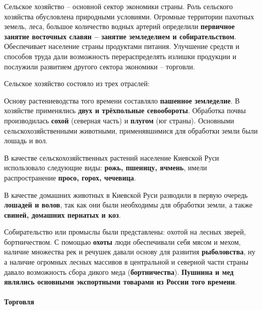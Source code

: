 \documentclass{article}
\begin{document}
Сельское хозяйство – основной сектор экономики страны. Роль сельского хозяйства обусловлена природными условиями. Огромные территории пахотных земель, леса, большое количество водных артерий определили \textbf{первичное занятие восточных славян – занятие земледелием и собирательством}. Обеспечивает население страны продуктами питания. Улучшение средств и способов труда дали возможность перераспределять излишки продукции и послужили развитием другого сектора экономики – торговли.


Сельское хозяйство состояло из трех отраслей: 

\begin{multienumerate}
\end{multienumerate}

\hfill

Основу растениеводства того времени составляло \textbf{пашенное земледелие}. В хозяйстве применялись \textbf{двух и трёхпольные севообороты}. Обработка почвы производилась \textbf{сохой} (северная часть) и \textbf{плугом} (юг страны). Основными сельскохозяйственными животными, применявшимися для обработки земли были лошадь и вол.

\hfill

В качестве сельскохозяйственных растений население Киевской Руси использовало следующие виды: \textbf{рожь, пшеницу, ячмень}, имели распространение \textbf{просо, горох, чечевица}.

\hfill

В качестве домашних животных в Киевской Руси разводили в первую очередь \textbf{лошадей и волов}, так как они были необходимы для обработки земли, а также \textbf{свиней, домашних пернатых и коз}.

\hfill

Собирательство или промыслы были представлены: охотой на лесных зверей, бортничеством. С помощью \textbf{охоты} люди обеспечивали себя мясом и мехом, наличие множества рек и речушек давали основу для развития \textbf{рыболовства}, ну а наличие огромных лесных массивов в центральной и северной части страны давало возможность сбора дикого меда (\textbf{бортничества}). \textbf{Пушнина и мед являлись основными экспортными товарами из России того времени}.

\paragraph{Торговля}
\end{document}
